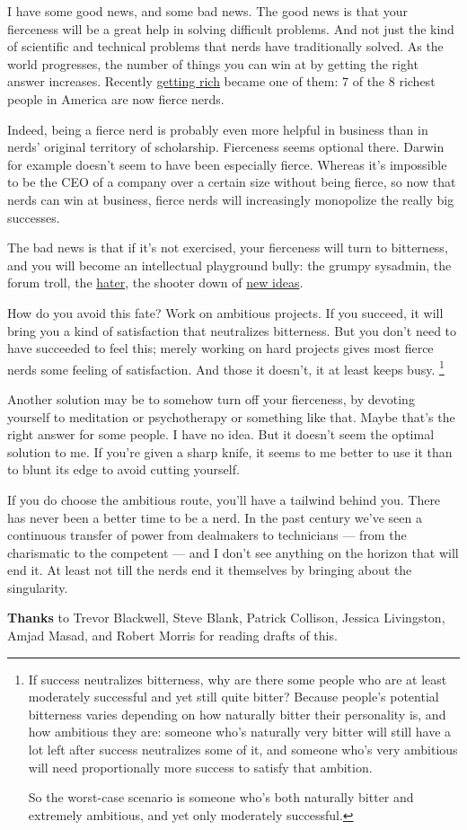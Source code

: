 I have some good news, and some bad news. The good news is that your
fierceness will be a great help in solving difficult problems. And not
just the kind of scientific and technical problems that nerds have
traditionally solved. As the world progresses, the number of things you
can win at by getting the right answer increases. Recently
\href{richnow.html}{getting rich} became one of them: 7 of the 8 richest
people in America are now fierce nerds.

Indeed, being a fierce nerd is probably even more helpful in business
than in nerds' original territory of scholarship. Fierceness seems
optional there. Darwin for example doesn't seem to have been especially
fierce. Whereas it's impossible to be the CEO of a company over a
certain size without being fierce, so now that nerds can win at
business, fierce nerds will increasingly monopolize the really big
successes.

The bad news is that if it's not exercised, your fierceness will turn to
bitterness, and you will become an intellectual playground bully: the
grumpy sysadmin, the forum troll, the \href{fh.html}{hater}, the shooter
down of \href{newideas.html}{new ideas}.

How do you avoid this fate? Work on ambitious projects. If you succeed,
it will bring you a kind of satisfaction that neutralizes bitterness.
But you don't need to have succeeded to feel this; merely working on
hard projects gives most fierce nerds some feeling of satisfaction. And
those it doesn't, it at least keeps busy. \footnote{If success neutralizes bitterness, why are there some people who
are at least moderately successful and yet still quite bitter? Because
people's potential bitterness varies depending on how naturally bitter
their personality is, and how ambitious they are: someone who's
naturally very bitter will still have a lot left after success
neutralizes some of it, and someone who's very ambitious will need
proportionally more success to satisfy that ambition.

So the worst-case scenario is someone who's both naturally bitter and
extremely ambitious, and yet only moderately successful.}

Another solution may be to somehow turn off your fierceness, by devoting
yourself to meditation or psychotherapy or something like that. Maybe
that's the right answer for some people. I have no idea. But it doesn't
seem the optimal solution to me. If you're given a sharp knife, it seems
to me better to use it than to blunt its edge to avoid cutting yourself.

If you do choose the ambitious route, you'll have a tailwind behind you.
There has never been a better time to be a nerd. In the past century
we've seen a continuous transfer of power from dealmakers to technicians
--- from the charismatic to the competent --- and I don't see anything
on the horizon that will end it. At least not till the nerds end it
themselves by bringing about the singularity.


\textbf{Thanks} to Trevor Blackwell, Steve Blank, Patrick Collison,
Jessica Livingston, Amjad Masad, and Robert Morris for reading drafts of
this.